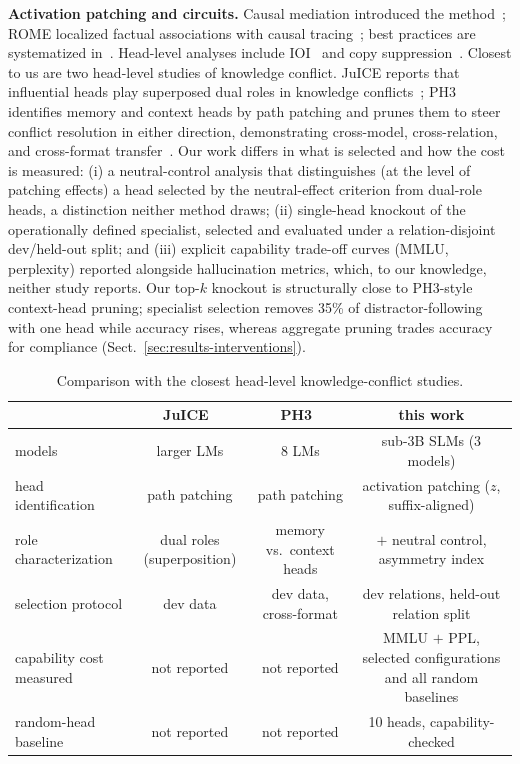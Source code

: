 \documentclass[paper]{ieice}
\begin{document}
\textbf{Activation patching and circuits.} Causal mediation introduced the
method~\cite{vig2020bias}; ROME localized factual associations with causal
tracing~\cite{meng2022rome}; best practices are systematized
in~\cite{zhang2024bestpractices}. Head-level analyses include
IOI~\cite{wang2023ioi} and copy suppression~\cite{mcdougall2023copy}.
Closest to us are two head-level studies of knowledge conflict. JuICE
reports that influential heads play superposed dual roles in knowledge
conflicts~\cite{li2025juice}; PH3 identifies memory and context heads by
path patching and prunes them to steer conflict resolution in either
direction, demonstrating cross-model, cross-relation, and cross-format
transfer~\cite{jin2024ph3}. Our work differs in what is selected and how
the cost is measured: (i) a neutral-control analysis that distinguishes (at the level of
patching effects) a head selected by the neutral-effect criterion from
dual-role heads, a distinction neither method draws; (ii) single-head
knockout of the operationally defined specialist, selected and
evaluated under
a relation-disjoint dev/held-out split; and (iii) explicit capability
trade-off curves (MMLU, perplexity) reported alongside hallucination
metrics, which, to our knowledge, neither study reports. Our top-$k$ knockout is
structurally close to PH3-style context-head pruning; specialist
selection removes 35\% of distractor-following with one head while
accuracy rises, whereas aggregate pruning trades accuracy for
compliance (Sect.~\ref{sec:results-interventions}).

\begin{table}[t]
\caption{Comparison with the closest head-level knowledge-conflict
studies.}
\label{tab:related}
\begin{center}
\begin{tabular}{lccc}
\toprule
 & JuICE~\cite{li2025juice} & PH3~\cite{jin2024ph3} & this work \\
\midrule
models & larger LMs & 8 LMs & sub-3B SLMs (3 models) \\
head identification & path patching & path patching & activation patching ($z$, suffix-aligned) \\
role characterization & dual roles (superposition) & memory vs.\ context heads & $+$ neutral control, asymmetry index \\
selection protocol & dev data & dev data, cross-format & dev relations, held-out relation split \\
capability cost measured & not reported & not reported & MMLU $+$ PPL, selected configurations and all random baselines \\
random-head baseline & not reported & not reported & 10 heads, capability-checked \\
\bottomrule
\end{tabular}
\end{center}
\end{table}
\end{document}
